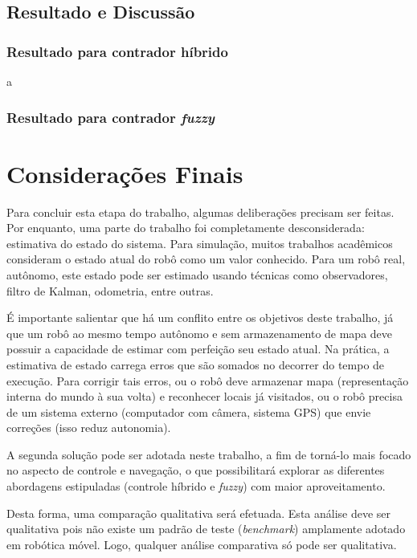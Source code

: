 \section{Resultado e Discussão}

	\subsection{Resultado para contrador híbrido}

	a
	
	\subsection{Resultado para contrador \textit{fuzzy}}

\chapter{Considerações Finais}
\vspace{-2.5 cm}

Para concluir esta etapa do trabalho, algumas deliberações precisam ser feitas.
Por enquanto, uma parte do trabalho foi completamente desconsiderada: estimativa
do estado do sistema. Para simulação, muitos trabalhos acadêmicos consideram o
estado atual do robô como um valor conhecido. Para um robô real, autônomo, este
estado pode ser estimado usando técnicas como observadores, filtro de Kalman,
odometria, entre outras.

É importante salientar que há um conflito entre os objetivos deste trabalho,
já que um robô ao mesmo tempo autônomo e sem armazenamento de mapa deve possuir
a capacidade de estimar com perfeição seu estado atual. Na prática, a estimativa
de estado carrega erros que são somados no decorrer do tempo de execução. Para
corrigir tais erros, ou o robô deve armazenar mapa (representação interna do
mundo à sua volta) e reconhecer locais já visitados, ou o robô precisa de um
sistema externo (computador com câmera, sistema GPS) que envie correções
(isso reduz autonomia). 

A segunda solução pode ser adotada neste trabalho, a fim de torná-lo mais focado
no aspecto de controle e navegação, o que possibilitará explorar as diferentes
abordagens estipuladas (controle híbrido e \textit{fuzzy}) com maior
aproveitamento. 

Desta forma, uma comparação qualitativa será efetuada. Esta análise
deve ser qualitativa pois não existe um padrão de teste (\textit{benchmark})
amplamente adotado em robótica móvel. Logo, qualquer análise comparativa só pode
ser qualitativa.








